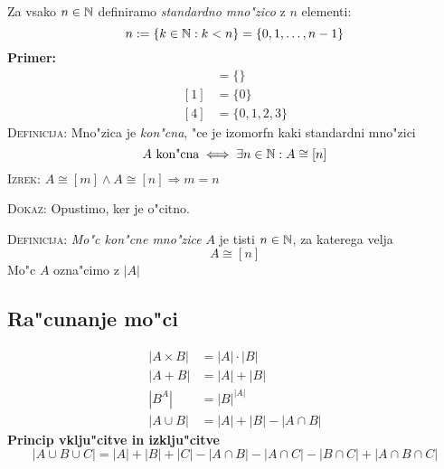 Za vsako $n \in \mathbb{N}$ definiramo \emph{standardno mno"zico} z $n$ elementi:
\begin{equation*}
n := \{k \in \mathbb{N}: k < n\} = \{0, 1, \ldots, n-1\}
\end{equation*}
\textbf{Primer:}
\begin{align*}
[0] &= \{\}\\
[1] &= \{0\} \\
[4] &= \{0, 1, 2, 3\}
\end{align*}
\textsc{Definicija:} Mno"zica je \emph{kon"cna}, "ce je izomorfn kaki standardni mno"zici
\begin{equation*}
\text{$A$ kon"cna} \iff \exists n \in \mathbb{N}: A \cong [n]
\end{equation*}
\textsc{Izrek:} $A \cong [m] \land A \cong [n] \Rightarrow m = n$

\textsc{Dokaz:} Opustimo, ker je o"citno.

\textsc{Definicija:} \emph{Mo"c kon"cne mno"zice} $A$ je tisti $n \in \mathbb{N}$, za katerega velja
\begin{equation*}
A \cong [n]
\end{equation*}
Mo"c $A$ ozna"cimo z $|A|$
\subsection{Ra"cunanje mo"ci}
\begin{align*}
|A \times B| &= |A| \cdot |B| \\
|A + B|& = |A| + |B| \\
\left|B^A\right| &= |B|^{|A|} \\
|A \cup B| &= |A| + |B| - |A \cap B|
\end{align*}
\textbf{Princip vklju"citve in izklju"citve}
\begin{equation*}
|A \cup B \cup C| = |A| + |B| + |C| - |A \cap B| - |A \cap C| - |B \cap C| + |A \cap B \cap C|
\end{equation*}